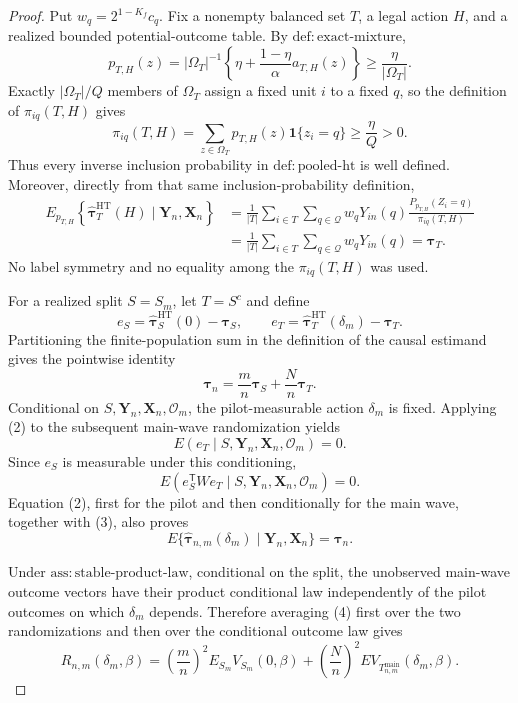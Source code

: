 \documentclass{article}
\begin{document}
\begin{proof}
Put \(w_q=2^{1-K_f}c_q\).  Fix a nonempty balanced set \(T\), a legal action \(H\), and a realized bounded potential-outcome table.  By \(\mathrm{def{:}exact\text{-}mixture}\),
\[
p_{T,H}(z)
=|\Omega_T|^{-1}\left\{\eta+\frac{1-\eta}{\alpha}a_{T,H}(z)\right\}
\geq \frac{\eta}{|\Omega_T|}.
\]
Exactly \(|\Omega_T|/Q\) members of \(\Omega_T\) assign a fixed unit \(i\) to a fixed \(q\), so the definition of \(\pi_{iq}(T,H)\) gives
\[
\pi_{iq}(T,H)
=\sum_{z\in\Omega_T}p_{T,H}(z)\mathbf 1\{z_i=q\}
\geq \frac{\eta}{Q}>0.
\tag{1}
\]
Thus every inverse inclusion probability in \(\mathrm{def{:}pooled\text{-}ht}\) is well defined.  Moreover, directly from that same inclusion-probability definition,
\[
\begin{aligned}
E_{p_{T,H}}\!\left\{
\widehat{\boldsymbol\tau}^{\mathrm{HT}}_T(H)
\mid\mathbf Y_n,\mathbf X_n\right\}
&=\frac1{|T|}\sum_{i\in T}\sum_{q\in\mathcal Q}
w_qY_{in}(q)
\frac{P_{p_{T,H}}(Z_i=q)}{\pi_{iq}(T,H)}\\
&=\frac1{|T|}\sum_{i\in T}\sum_{q\in\mathcal Q}w_qY_{in}(q)
=\boldsymbol\tau_T.
\end{aligned}
\tag{2}
\]
No label symmetry and no equality among the \(\pi_{iq}(T,H)\) was used.

For a realized split \(S=S_m\), let \(T=S^c\) and define
\[
e_S=\widehat{\boldsymbol\tau}^{\mathrm{HT}}_S(0)-\boldsymbol\tau_S,
\qquad
e_T=\widehat{\boldsymbol\tau}^{\mathrm{HT}}_T(\delta_m)-\boldsymbol\tau_T.
\]
Partitioning the finite-population sum in the definition of the causal estimand gives the pointwise identity
\[
\boldsymbol\tau_n=\frac mn\boldsymbol\tau_S+\frac Nn\boldsymbol\tau_T.
\tag{3}
\]
Conditional on \(S,\mathbf Y_n,\mathbf X_n,\mathcal O_m\), the pilot-measurable action \(\delta_m\) is fixed.  Applying (2) to the subsequent main-wave randomization yields
\[
E(e_T\mid S,\mathbf Y_n,\mathbf X_n,\mathcal O_m)=0.
\]
Since \(e_S\) is measurable under this conditioning,
\[
E(e_S^{\mathsf T}We_T\mid S,\mathbf Y_n,\mathbf X_n,\mathcal O_m)=0.
\tag{4}
\]
Equation (2), first for the pilot and then conditionally for the main wave, together with (3), also proves
\[
E\{\widehat{\boldsymbol\tau}_{n,m}(\delta_m)
\mid\mathbf Y_n,\mathbf X_n\}=\boldsymbol\tau_n.
\tag{5}
\]

Under \(\mathrm{ass{:}stable\text{-}product\text{-}law}\), conditional on the split, the unobserved main-wave outcome vectors have their product conditional law independently of the pilot outcomes on which \(\delta_m\) depends.  Therefore averaging (4) first over the two randomizations and then over the conditional outcome law gives
\[
R_{n,m}(\delta_m,\beta)
=\left(\frac mn\right)^2E_{S_m}V_{S_m}(0,\beta)
+\left(\frac Nn\right)^2
E V_{T_{n,m}^{\mathrm{main}}}(\delta_m,\beta).
\tag{6}
\]


\end{proof}
\end{document}
